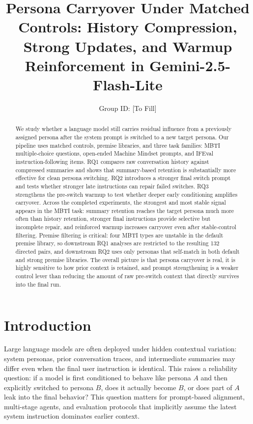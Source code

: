\documentclass[11pt]{article}
\title{\textbf{Persona Carryover Under Matched Controls: History Compression, Strong Updates, and Warmup Reinforcement in Gemini-2.5-Flash-Lite}}
\author{Group ID: [To Fill] \\ [Member Names]}
\date{}
\begin{document}
\maketitle
\vspace{-1em}

\begin{abstract}
We study whether a language model still carries residual influence from a previously assigned persona after the system prompt is switched to a new target persona.
Our pipeline uses matched controls, premise libraries, and three task families: MBTI multiple-choice questions, open-ended Machine Mindset prompts, and IFEval instruction-following items.
RQ1 compares raw conversation history against compressed summaries and shows that summary-based retention is substantially more effective for clean persona switching.
RQ2 introduces a stronger final switch prompt and tests whether stronger late instructions can repair failed switches.
RQ3 strengthens the pre-switch warmup to test whether deeper early conditioning amplifies carryover.
Across the completed experiments, the strongest and most stable signal appears in the MBTI task: summary retention reaches the target persona much more often than history retention, stronger final instructions provide selective but incomplete repair, and reinforced warmup increases carryover even after stable-control filtering.
Premise filtering is critical: four MBTI types are unstable in the default premise library, so downstream RQ1 analyses are restricted to the resulting 132 directed pairs, and downstream RQ2 uses only personas that self-match in both default and strong premise libraries.
The overall picture is that persona carryover is real, it is highly sensitive to how prior context is retained, and prompt strengthening is a weaker control lever than reducing the amount of raw pre-switch context that directly survives into the final run.
\end{abstract}

\section{Introduction}

Large language models are often deployed under hidden contextual variation: system personas, prior conversation traces, and intermediate summaries may differ even when the final user instruction is identical.
This raises a reliability question: if a model is first conditioned to behave like persona $A$ and then explicitly switched to persona $B$, does it actually become $B$, or does part of $A$ leak into the final behavior?
This question matters for prompt-based alignment, multi-stage agents, and evaluation protocols that implicitly assume the latest system instruction dominates earlier context.
\end{document}
